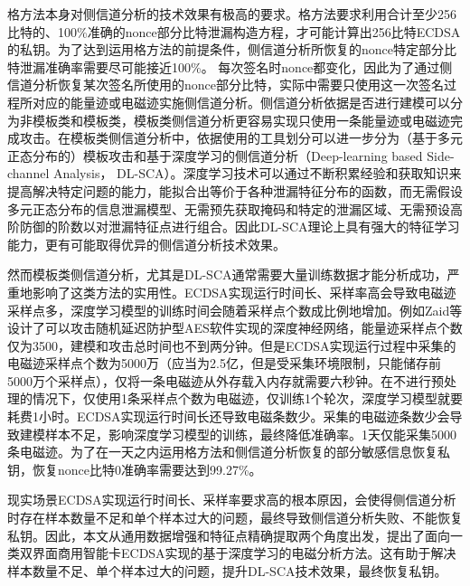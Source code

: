 {%
	格方法本身对侧信道分析的技术效果有极高的要求。格方法要求利用合计至少256比特的、100\%准确的nonce部分比特泄漏构造方程，才可能计算出256比特ECDSA的私钥。为了达到运用格方法的前提条件，侧信道分析所恢复的nonce特定部分比特泄漏准确率需要尽可能接近100\%。
	每次签名时nonce都变化，因此为了通过侧信道分析恢复某次签名所使用的nonce部分比特，实际中需要只使用这一次签名过程所对应的能量迹或电磁迹实施侧信道分析。侧信道分析依据是否进行建模可以分为非模板类和模板类，模板类侧信道分析更容易实现只使用一条能量迹或电磁迹完成攻击。在模板类侧信道分析中，依据使用的工具划分可以进一步分为（基于多元正态分布的）模板攻击和基于深度学习的侧信道分析（Deep-learning based Side-channel Analysis， DL-SCA）。深度学习技术可以通过不断积累经验和获取知识来提高解决特定问题的能力，能拟合出等价于各种泄漏特征分布的函数，而无需假设多元正态分布的信息泄漏模型、无需预先获取掩码和特定的泄漏区域、无需预设高阶防御的阶数以对泄漏特征点进行组合。因此DL-SCA理论上具有强大的特征学习能力，更有可能取得优异的侧信道分析技术效果。
	
%	
	然而模板类侧信道分析，尤其是DL-SCA通常需要大量训练数据才能分析成功，严重地影响了这类方法的实用性。ECDSA实现运行时间长、采样率高会导致电磁迹采样点多，深度学习模型的训练时间会随着采样点个数成比例地增加。例如Zaid等\citep{Zaid20}设计了可以攻击随机延迟防护型AES软件实现的深度神经网络，能量迹采样点个数仅为3500，建模和攻击总时间也不到两分钟。但是ECDSA实现运行过程中采集的电磁迹采样点个数为5000万（应当为2.5亿，但是受采集环境限制，只能储存前5000万个采样点），仅将一条电磁迹从外存载入内存就需要六秒钟。在不进行预处理的情况下，仅使用1条采样点个数为电磁迹，仅训练1个轮次，深度学习模型就要耗费1小时。ECDSA实现运行时间长还导致电磁条数少。采集的电磁迹条数少会导致建模样本不足，影响深度学习模型的训练，最终降低准确率。1天仅能采集5000条电磁迹。为了在一天之内运用格方法和侧信道分析恢复的部分敏感信息恢复私钥，恢复nonce比特0准确率需要达到99.27\%。
	
	现实场景ECDSA实现运行时间长、采样率要求高的根本原因，会使得侧信道分析时存在样本数量不足和单个样本过大的问题，最终导致侧信道分析失败、不能恢复私钥。因此，本文从通用数据增强和特征点精确提取两个角度出发，提出了面向一类双界面商用智能卡ECDSA实现的基于深度学习的电磁分析方法。这有助于解决样本数量不足、单个样本过大的问题，提升DL-SCA技术效果，最终恢复私钥。
	
}
